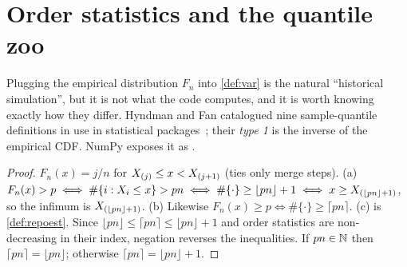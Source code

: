 
\section{Order statistics and the quantile zoo}
Plugging the empirical distribution $F_n$ into \cref{def:var} is the natural ``historical simulation'', but it is not what the
code computes, and it is worth knowing exactly how they differ. Hyndman and Fan catalogued nine sample-quantile
definitions in use in statistical packages~\cite{hyndman1996sample}; their \emph{type 1} is the inverse of the empirical
CDF. NumPy exposes it as .

\begin{proof}
$F_n(x)=j/n$ for $X_{(j)}\le x<X_{(j+1)}$ (ties only merge steps). (a) $F_n(x)>p\iff \#\{i:X_i\le x\}>pn\iff
\#\{\cdot\}\ge\lfloor pn\rfloor+1\iff x\ge X_{(\lfloor pn\rfloor+1)}$, so the infimum is $X_{(\lfloor pn\rfloor+1)}$.
(b) Likewise $F_n(x)\ge p\iff\#\{\cdot\}\ge\lceil pn\rceil$. (c) is \cref{def:repoest}. Since
$\lfloor pn\rfloor\le\lceil pn\rceil\le\lfloor pn\rfloor+1$ and order statistics are non-decreasing in their index,
negation reverses the inequalities. If $pn\in\mathbb{N}$ then $\lceil pn\rceil=\lfloor pn\rfloor$; otherwise
$\lceil pn\rceil=\lfloor pn\rfloor+1$.
\end{proof}

